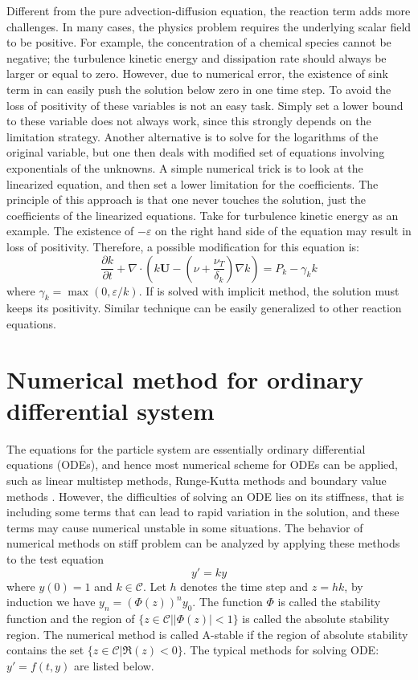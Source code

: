 Different from the pure advection-diffusion equation, the reaction term adds more challenges. In many cases, the physics problem requires the underlying scalar field to be positive. For example, the concentration of a chemical species cannot be negative; the turbulence kinetic energy and dissipation rate should always be larger or equal to zero. However, due to numerical error, the existence of sink term in  can easily push the solution below zero in one time step. To avoid the loss of positivity of these variables is not an easy task. Simply set a lower bound to these variable does not always work, since this strongly depends on the limitation strategy. Another alternative is to solve for the logarithms of the original variable, but one then deals with modified set of equations involving exponentials of the unknowns. A simple numerical trick is to look at the linearized equation, and then set a lower limitation for the coefficients. The principle of this approach is that one never touches the solution, just the coefficients of the linearized equations. Take  for turbulence kinetic energy as an example. The existence of $-\varepsilon$ on the right hand side of the equation may result in loss of positivity. Therefore, a possible modification for this equation is:
\begin{equation}
\frac{\partial k}{\partial t}
+\nabla\cdot(k\mathbf{U}
-(\nu+\frac{\nu_T}{\delta_k})\nabla k) 
= P_k - \gamma_k k
\label{eq:k_eqn}
\end{equation}
where $\gamma_k = \max(0, \varepsilon/k)$. If  is solved with implicit method, the solution must keeps its positivity. Similar technique can be easily generalized to other reaction equations.

\section{Numerical method for ordinary differential system}
The equations for the particle system are essentially ordinary differential equations (ODEs), and hence most numerical scheme for ODEs can be applied, such as linear multistep methods, Runge-Kutta methods \cite{Butcher2003Numerical} and boundary value methods \cite{Brugnano1998Boundary}. However, the difficulties of solving an ODE lies on its stiffness, that is including some terms that can lead to rapid variation in the solution, and these terms may cause numerical unstable in some situations. The behavior of numerical methods on stiff problem can be analyzed by applying these methods to the test equation
\begin{equation}
y' = k y
\label{test_eqn}
\end{equation}   
where $y(0) = 1$ and $k \in \mathcal{C}$. Let $h$ denotes the time step and $z = hk$, by induction we have $y_n = (\Phi(z))^ny_0$. The function $\Phi$ is called the stability function and the region of $\{z\in \mathcal{C}| |\Phi(z)| < 1\}$ is called the absolute stability region. The numerical method is called A-stable if the region of absolute stability contains the set $\{ z \in \mathcal{C}| \Re(z) < 0\}$. The typical methods for solving ODE: $y' = f(t,y)$ are listed below.

